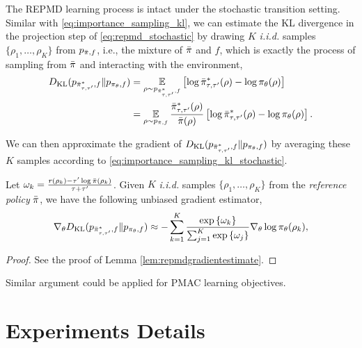 The REPMD learning process is intact under the stochastic transition setting. Similar with \cref{eq:importance_sampling_kl}, we can estimate the KL divergence in the projection step of \cref{eq:repmd_stochastic} by drawing $K$ \textit{i.i.d.} samples $\{\rho_1, \dots, \rho_K\}$ from $p_{\bar{\pi}, f}$, i.e., the mixture of $\bar{\pi}$ and $f$, which is exactly the process of sampling from $\bar{\pi}$ and interacting with the environment,
\begin{equation}
\label{eq:importance_sampling_kl_stochastic}
\begin{split}
	D_{\mathrm{KL}}(p_{\bar{\pi}_{\tau,\tau^{\prime}}^*, f}  \| p_{\pi_\theta, f} ) &= \operatorname*{\mathbb{E}}_{\rho \sim p_{\bar{\pi}_{\tau,\tau^{\prime}}^*, f} } \left[ \log \bar{\pi}_{\tau,\tau^{\prime}}^*(\rho) - \log \pi_\theta(\rho) \right] \\
	&= \operatorname*{\mathbb{E}}_{\rho\sim p_{\bar{\pi}, f}} \frac{\bar{\pi}_{\tau,\tau^{\prime}}^*(\rho)}{\bar{\pi}(\rho)} \left[ \log \bar{\pi}_{\tau,\tau^{\prime}}^*(\rho) - \log \pi_\theta(\rho) \right].
\end{split}
\end{equation}

We can then approximate the gradient of $D_{\mathrm{KL}}(p_{\bar{\pi}_{\tau,\tau^{\prime}}^*, f}  \| p_{\pi_\theta, f} )$ by averaging these $K$ samples according to \cref{eq:importance_sampling_kl_stochastic}. 

\begin{thm}
\label{thm:repmdgradientestimate_stochastic}
Let $\omega_k = \frac{r(\rho_k) - \tau^{\prime} \log{\bar{\pi}(\rho_k)} }{\tau + \tau^{\prime}}$. Given $K$ \emph{i.i.d.} samples $\{\rho_1, \dots, \rho_K\}$ from the \emph{reference policy} $\bar{\pi}$, we have the following unbiased gradient estimator,
\begin{equation}
	\nabla_{\theta} D_{\mathrm{KL}}(p_{\bar{\pi}_{\tau,\tau^{\prime}}^*, f}  \| p_{\pi_\theta, f} ) \approx -\sum\limits_{k=1}^K{ \frac{ \exp\left\{ \omega_k \right\} }{ \sum_{j=1}^K{ \exp\left\{ \omega_j \right\}}} \nabla_{\theta} \log{\pi_\theta(\rho_k)} },
\end{equation}
\end{thm}
\begin{proof}
See the proof of Lemma \ref{lem:repmdgradientestimate}.
\end{proof}

Similar argument could be applied for PMAC learning objectives. 

\section{Experiments Details}
\label{appendix-experiments}

